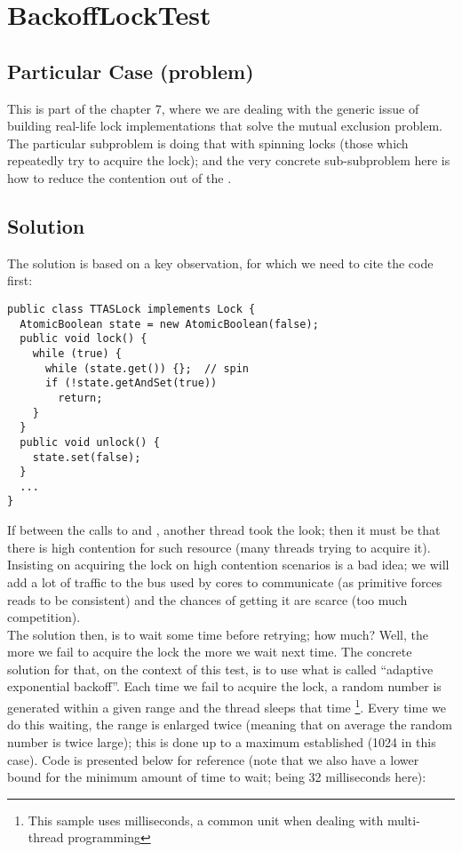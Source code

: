 \section{\textbf{BackoffLockTest}}

\subsection{Particular Case (problem)}
This is part of the chapter 7, where we are dealing with the generic
issue of building real-life lock implementations that solve the
mutual exclusion problem. The particular subproblem is doing that
with spinning locks (those which repeatedly try to acquire the lock);
and the very concrete sub-subproblem here is how to reduce the
contention out of the .

\subsection{Solution}
The solution is based on a key observation, for which we need to cite
the  code first: \\

\begin{lstlisting}[style=numbers]
public class TTASLock implements Lock {
  AtomicBoolean state = new AtomicBoolean(false);
  public void lock() {
    while (true) {
      while (state.get()) {};  // spin
      if (!state.getAndSet(true))
        return;
    }
  }
  public void unlock() {
    state.set(false);
  }
  ...
}
\end{lstlisting}
\hfill

If between the calls to  and , another thread took
the look; then it must be that there is high contention for such
resource (many threads trying to acquire it). Insisting on acquiring
the lock on high contention scenarios is a bad idea; we will add a lot
of traffic to the bus used by cores to communicate (as primitive
 forces reads to be consistent) and the chances of
getting it are scarce (too much competition). \\

The solution then, is to wait some time before retrying; how much?
Well, the more we fail to acquire the lock the more we wait next time.
The concrete solution for that, on the context of this test, is to use
what is called ``adaptive exponential backoff''. Each time we fail to
acquire the lock, a random number is generated within a given range
and the thread sleeps that time \footnote{This sample uses
  milliseconds, a common unit when dealing with multi-thread
  programming}. Every time we do this waiting, the range is enlarged
twice (meaning that on average the random number is twice large);
this is done up to a maximum established (1024 in this case). 
Code is presented below for reference (note that we also have a lower
bound for the minimum amount of time to wait; being 32 milliseconds
here): \\

